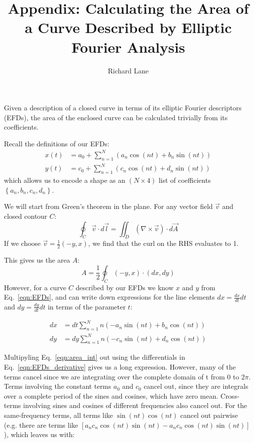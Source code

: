 \documentclass[11pt,a4paper]{article}
\author{Richard Lane}
\title{Appendix: Calculating the Area of a Curve Described by Elliptic Fourier Analysis}
\begin{document}
\maketitle

\label{app:efa-area}
Given a description of a closed curve in terms of its elliptic Fourier descriptors (EFDs), the
area of the enclosed curve can be calculated trivially from its coefficients.

Recall the definitions of our EFDs:
\begin{equation}
	\label{eqn:EFDs}
	\begin{aligned}
		x(t) & = a_0 + \sum_{n=1}^{N}
		\left(
		a_n\cos(nt) + b_n\sin(nt)
		\right)                       \\
		y(t) & = c_0 + \sum_{n=1}^{N}
		\left(
		c_n\cos(nt) + d_n\sin(nt)
		\right)
	\end{aligned}
\end{equation}
which allows us to encode a shape as an $\left(N\times4\right)$ list of coefficients $\left\{a_n,b_n,c_n,d_n\right\}$.

We will start from Green's theorem in the plane. For any vector field $\vec{v}$ and closed contour $C$:
\begin{equation}
	\label{eqn:green_theorem}
	\oint_C \vec{v} \cdot d\vec{l} = \iint_D (\nabla \times \vec{v}) \cdot d\vec{A}
\end{equation}
If we choose $\vec{v} = \frac{1}{2}\left(-y, x\right)$, we find that the curl on the RHS evaluates to 1.

This gives us the area $A$:
\begin{equation}
	\label{eqn:area_int}
	A = \frac{1}{2}\oint_C \left(-y, x\right) \cdot \left(dx, dy\right)
\end{equation}
However, for a curve $C$ described by our EFDs we know $x$ and $y$ from Eq.~\ref{eqn:EFDs},
and can write down expressions for the line elements $dx = \frac{dx}{dt}dt$ and $dy = \frac{dy}{dt}dt$
in terms of the parameter $t$:

\begin{equation}
	\label{eqn:EFDs_derivative}
	\begin{aligned}
		dx & = dt\sum_{n=1}^{N}
		n\left(
		-a_n\sin(nt) + b_n\cos(nt)
		\right)                 \\
		dy & = dy\sum_{n=1}^{N}
		n\left(
		-c_n\sin(nt) + d_n\cos(nt)
		\right)
	\end{aligned}
\end{equation}

Multipyling Eq.~\ref{eqn:area_int} out using the differentials in Eq.~\ref{eqn:EFDs_derivative} gives us a long
expression. However, many of the terms cancel since we are integrating over the complete domain of t from $0$ to $2\pi$.
Terms involving the constant terms $a_0$ and $c_0$ cancel out, since they are integrals over a complete period of the sines and cosines,
which have zero mean. Cross-terms involving sines and cosines of different frequencies also cancel out.
For the same-frequency terms, all terms like $\sin(nt)\cos(nt)$ cancel out pairwise (e.g. there are terms like
$\left[a_nc_n\cos(nt)\sin(nt) - a_nc_n\cos(nt)\sin(nt)\right]$), which leaves us with:
\end{document}
